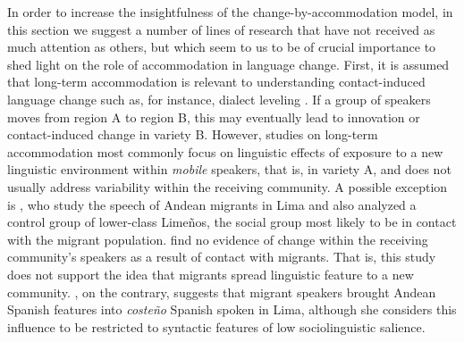 \documentclass[output=paper,
modfonts
]{langscibook}
\begin{document}
In order to increase the insightfulness of the change-by-accommodation model, in this section we suggest a number of lines of research that have not received as much attention as others, but which seem to us to be of crucial importance to shed light on the role of accommodation in language change. 
% 
% 
% 
% 
% 
%
First, it is assumed that long-term accommodation is relevant to understanding contact-induced language change such as, for instance, dialect leveling \citep{trudgill_dialects_1986}. If a group of speakers moves from region A to region B, this may eventually lead to innovation or contact-induced change in variety B. However, studies on long-term accommodation most commonly focus on linguistic effects of exposure to a new linguistic environment within \textit{mobile} speakers, that is, in variety A, and does not usually address variability within the receiving community.
% 
% 
A possible exception is \citet{klee_andean_2006}, who study the speech of Andean migrants in Lima and also analyzed a control group of lower-class Limeños, the social group most likely to be in contact with the migrant population. \cite{klee_andean_2006} find no evidence of change within the receiving community's speakers as a result of contact with migrants. That is, this study does not support the idea that migrants spread linguistic feature to a new community. \cite{Escobar2007}, on the contrary, suggests that migrant speakers brought Andean Spanish features into \textit{costeño} Spanish spoken in Lima, although she considers this influence to be restricted to syntactic features of low sociolinguistic salience.
% 
% 
\end{document}
